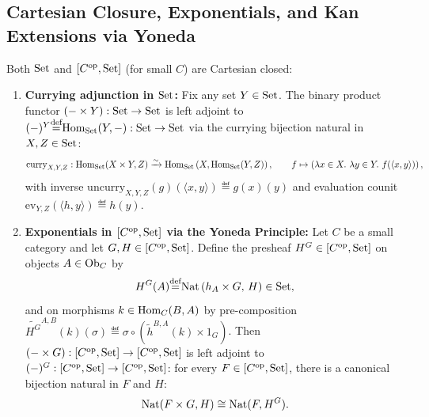 \documentclass[10pt,a4paper]{article}
\begin{document}
\subsection{Cartesian Closure, Exponentials, and Kan Extensions via Yoneda}
\begin{theorem}\label{thm:cartesian_closed}
Both ${\textrm{Set}}$ and $[C^{\textrm{op}}, {\textrm{Set}}]$ (for small $C$) are Cartesian closed:
\begin{enumerate}
\item \textbf{Currying adjunction in ${\textrm{Set}}$:} Fix any set $Y \in {\textrm{Set}}$. The binary product functor $(- \times Y) : {\textrm{Set}} \to {\textrm{Set}}$ is left adjoint to $(-)^Y {\stackrel{{\textrm{def}}}{=}} {\textrm{Hom}}_{\textrm{Set}}(Y, -) : {\textrm{Set}} \to {\textrm{Set}}$ via the currying bijection natural in $X, Z \in {\textrm{Set}}$:
$$\mathrm{curry}_{X,Y,Z} : {\textrm{Hom}}_{\textrm{Set}}(X \times Y, Z) \xrightarrow{\sim} {\textrm{Hom}}_{\textrm{Set}}\left(X, {\textrm{Hom}}_{\textrm{Set}}(Y, Z)\right), \qquad f \mapsto \left(\lambda x \in X.\ \lambda y \in Y.\ f(\langle x, y \rangle)\right),$$
with inverse $\mathrm{uncurry}_{X,Y,Z}(g)(\langle x, y \rangle) \eqdef g(x)(y)$ and evaluation counit $\mathrm{ev}_{Y,Z}(\langle h, y \rangle) \eqdef h(y)$.
\item \textbf{Exponentials in $[C^{\textrm{op}}, {\textrm{Set}}]$ via the Yoneda Principle:} Let $C$ be a small category and let $G, H \in [C^{\textrm{op}}, {\textrm{Set}}]$. Define the presheaf $H^G \in [C^{\textrm{op}}, {\textrm{Set}}]$ on objects $A \in {\textrm{Ob}}_C$ by
$$H^G(A) {\stackrel{{\textrm{def}}}{=}} {\textrm{Nat}}\left(h_A \times G,\, H\right) \in {\textrm{Set}},$$
and on morphisms $k \in {\textrm{Hom}}_C(B, A)$ by pre-composition $\widetilde{H^G}^{A,B}(k)(\sigma) \eqdef \sigma \circ (\widetilde{h}^{B,A}(k) \times 1_G)$. Then $(- \times G) : [C^{\textrm{op}}, {\textrm{Set}}] \to [C^{\textrm{op}}, {\textrm{Set}}]$ is left adjoint to $(-)^G : [C^{\textrm{op}}, {\textrm{Set}}] \to [C^{\textrm{op}}, {\textrm{Set}}]$: for every $F \in [C^{\textrm{op}}, {\textrm{Set}}]$, there is a canonical bijection natural in $F$ and $H$:
$${\textrm{Nat}}(F \times G, H) \cong {\textrm{Nat}}(F, H^G).$$
\end{enumerate}
\end{theorem}
\myprf
\end{document}
